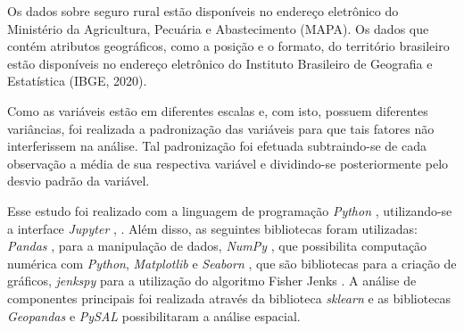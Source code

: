 Os dados sobre seguro rural estão disponíveis no endereço eletrônico do Ministério da Agricultura, Pecuária e Abastecimento (MAPA). Os dados que contém atributos geográficos, como a posição e o formato, do território brasileiro estão disponíveis no endereço eletrônico do Instituto Brasileiro de Geografia e Estatística (IBGE, 2020).
	
Como as variáveis estão em diferentes escalas e, com isto, possuem diferentes variâncias, foi realizada a padronização das variáveis para que tais fatores não interferissem na análise. Tal padronização foi efetuada subtraindo-se de cada observação a média de sua respectiva variável e dividindo-se posteriormente pelo desvio padrão da variável.

Esse estudo foi realizado com a linguagem de programação \textit{Python} \cite{python17_2}, utilizando-se a interface \textit{Jupyter} \cite{jupyter17_2}, \cite{perez07_2} \cite{kluyver19_2}.
Além disso, as seguintes bibliotecas foram utilizadas: 
\textit{Pandas} \cite{mckinney10_2}, para a manipulação de dados,
\textit{NumPy} \cite{walt11_2}, que possibilita computação numérica com \textit{Python},
\textit{Matplotlib} \cite{hunter07_2} e \textit{Seaborn} \cite{waskom14_2}, que são bibliotecas para a criação de gráficos,
\textit{jenkspy} para a utilização do algoritmo Fisher Jenks \cite{jenks77_2}. 
A análise de componentes principais foi realizada através da biblioteca \textit{sklearn} e as bibliotecas \textit{Geopandas} \cite{jordahl14_2} e \textit{PySAL} \cite{rey07_2} possibilitaram a análise espacial.




